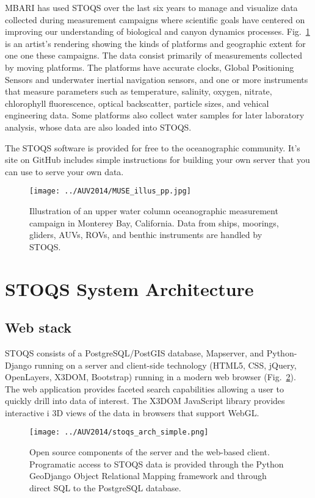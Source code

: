 \documentclass[conference]{IEEEtran}
\begin{document}
MBARI has used STOQS over the last six years to manage and visualize data collected 
during measurement campaigns where scientific goals have centered on improving 
our understanding of biological and canyon dynamics processes. Fig.~\ref{fig:MUSE_illus_pp} 
is an artist's rendering showing the kinds of platforms and geographic extent for one one 
these campaigns.  The data consist primarily of measurements 
collected by moving platforms. The platforms have accurate clocks, Global Positioning 
Sensors and underwater inertial navigation sensors, and one or more instruments that measure 
parameters such as temperature, salinity, oxygen, nitrate, chlorophyll fluorescence, 
optical backscatter, particle sizes, and vehical engineering data. Some platforms also collect
water samples for later laboratory analysis, whose data are also loaded into STOQS. 

The STOQS software is provided for free to the oceanographic community. It's site on
GitHub \cite{STOQS} includes simple instructions for building your own server that
you can use to serve your own data.

\begin{figure}[htbp]
\centering
\texttt{[image: ../AUV2014/MUSE\_illus\_pp.jpg]}
\caption{Illustration of an upper water column oceanographic measurement campaign in Monterey Bay, California. 
Data from ships, moorings, gliders, AUVs, ROVs, and benthic instruments are handled by STOQS.}
\label{fig:MUSE_illus_pp}
\end{figure}

\section{STOQS System Architecture}

\subsection{Web stack}

STOQS consists of a PostgreSQL/PostGIS database, Mapserver, and Python-Django 
running on a server and client-side technology (HTML5, CSS, jQuery, OpenLayers, 
X3DOM, Bootstrap) running in a modern web browser (Fig.~\ref{fig:STOQSArch}). 
The web application provides faceted search capabilities allowing a user to quickly 
drill into data of interest. The X3DOM JavaScript library provides interactive i
3D views of the data in browsers that support WebGL.  

\begin{figure}[htbp]
\centering
\texttt{[image: ../AUV2014/stoqs\_arch\_simple.png]}
\caption{Open source components of the server and the web-based client. Programatic access to 
STOQS data is provided through the Python GeoDjango Object Relational Mapping framework 
and through direct SQL to the PostgreSQL database.}
\label{fig:STOQSArch}
\end{figure}
\end{document}
